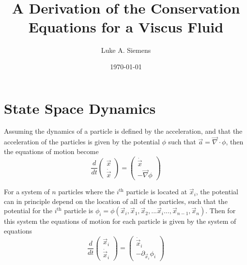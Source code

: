 \documentclass[%
 twocolumn,
 amsmath,amssymb,
 aps,
]{revtex4-1}
\newcommand{\dvec}[1]{\dot{\vec{#1}}}
\newcommand{\grad}{\vec{\nabla}}
\begin{document}
\title{A Derivation of the Conservation Equations for a Viscus Fluid}%

\author{Luke A. Siemens}

\date{\today}

\maketitle

\section{State Space Dynamics}

Assuming the dynamics of a particle is defined by the acceleration, and that the acceleration of the particles is given by the potential $\phi$ such that $\vec{a} = \vec{\nabla}\cdot\phi$, then the equations of motion become
\[
\frac{d}{dt}\begin{pmatrix} \vec{x} \\ \dvec{x} \end{pmatrix}=\begin{pmatrix} \dvec{x} \\ -\grad\phi \end{pmatrix}
\]

For a system of $n$ particles where the $i^{\text{th}}$ particle is located at $\vec{x}_i$, the potential can in principle depend on the location of all of the particles, such that the potential for the $i^{\text{th}}$ particle is $\phi_i = \phi({\vec{x}_i, \vec{x}_1, \vec{x}_2, ... \vec{x}_i ... , \vec{x}_{n-1}, \vec{x}_n})$. Then for this system the equations of motion for each particle is given by the system of equations
\begin{equation}
\frac{d}{dt}\begin{pmatrix} \vec{x}_i \\ \dvec{x}_i \end{pmatrix}=\begin{pmatrix} \dvec{x}_i \\ -\partial_{\vec{x}_i}\phi_i \end{pmatrix}
\label{discrete_system_dynamics}
\end{equation}
\end{document}
